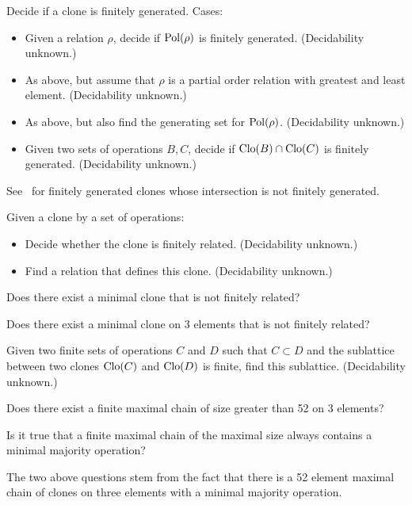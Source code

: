 \begin{question}
  Decide if a clone is finitely generated. Cases:
  \begin{itemize}
    \item Given a relation $\rho$, decide if $\operatorname{Pol}(\rho)$ is finitely
      generated. (Decidability unknown.)
    \item As above, but assume that $\rho$ is a partial order relation with
      greatest and least element. (Decidability unknown.)
    \item As above, but also find the generating set for $\operatorname{Pol}(\rho)$.
      (Decidability unknown.)
    \item Given two sets of operations $B, C$, decide if $\operatorname{Clo}(B)\cap \operatorname{Clo}(C)$
      is finitely generated. (Decidability unknown.)
  \end{itemize}
\end{question}
\begin{context}
  See~\cite{haddad} for finitely generated clones whose intersection is not
  finitely generated.
\end{context}

\begin{question}
Given a clone by a set of operations:
\begin{itemize}
  \item  Decide whether the clone is finitely related. (Decidability unknown.) 
  \item Find a relation that defines this clone. (Decidability unknown.)
\end{itemize}
\end{question}

\begin{question}
  Does there exist a minimal clone that is not finitely related?
\end{question}

\begin{question}
  Does there exist a minimal clone on 3 elements that is not finitely
  related?
\end{question}

\begin{question}
  Given two finite sets of operations $C$ and $D$ such
  that $C\subset D$ and the sublattice between two clones
  $\operatorname{Clo}(C)$ and $\operatorname{Clo}(D)$ is finite, find this sublattice. (Decidability
  unknown.)
\end{question}

\begin{question}
  Does there exist a finite maximal chain of size greater than 52 on 3
  elements?
\end{question}
\begin{question}
  Is it true that a finite maximal chain of the maximal size always
  contains a minimal majority operation?
\end{question}
\begin{context}
  The two above questions stem from the fact that there is a 52 element maximal
  chain of clones on three elements with a minimal majority operation.
\end{context}

